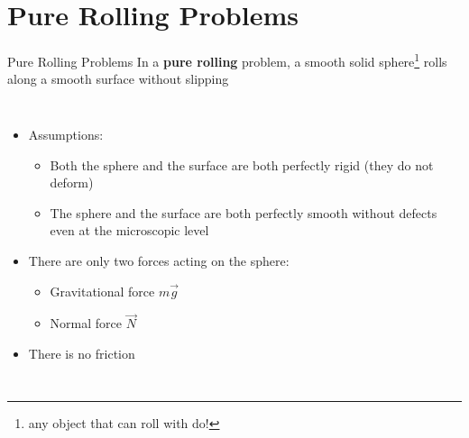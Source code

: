 \documentclass[12pt,compress,aspectratio=169]{beamer}
\begin{document}
\section{Pure Rolling Problems}

\begin{frame}{Pure Rolling Problems}
  In a \textbf{pure rolling} problem, a smooth solid sphere\footnote{any object
    that can roll with do!} rolls along a smooth surface without slipping
  \begin{columns}
    \centering

    \begin{itemize}
    \item Assumptions:
      \begin{itemize}
      \item Both the sphere and the surface are both perfectly rigid (they
        do not deform)
      \item The sphere and the surface are both perfectly smooth without defects
        even at the microscopic level
      \end{itemize}
    \item There are only two forces acting on the sphere:
      \begin{itemize}
      \item Gravitational force $m\vec g$
      \item Normal force $\vec N$
      \end{itemize}
    \item There is no friction
    \end{itemize}
  \end{columns}
\end{frame}
\end{document}
